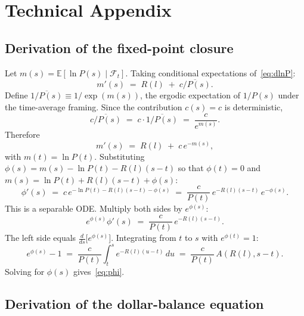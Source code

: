 \documentclass[11pt]{article}
\begin{document}
\newpage
\section{Technical Appendix}
\label{app:proofs}

\subsection{Derivation of the fixed-point closure}
\label{app:phi}

Let $m(s) = \mathbb{E}[\ln P(s) \mid \mathcal{F}_t]$. Taking
conditional expectations of~\eqref{eq:dlnP}:
\begin{equation}
  m'(s) \;=\; R(l) \;+\; \overline{c/P(s)}.
\end{equation}
Define $\overline{1/P(s)} \equiv 1/\exp(m(s))$, the ergodic
expectation of $1/P(s)$ under the time-average framing. Since the
contribution $c(s) = c$ is deterministic,
\begin{equation}
  \overline{c/P(s)} \;=\; c \cdot \overline{1/P(s)} \;=\; \frac{c}{e^{m(s)}}.
\end{equation}
Therefore
\begin{equation}
  m'(s) \;=\; R(l) \;+\; c\,e^{-m(s)},
\end{equation}
with $m(t) = \ln P(t)$. Substituting $\phi(s) = m(s) - \ln P(t) -
R(l)(s - t)$ so that $\phi(t) = 0$ and $m(s) = \ln P(t) + R(l)(s - t)
+ \phi(s)$:
\begin{equation}
  \phi'(s) \;=\; c\,e^{-\ln P(t) - R(l)(s - t) - \phi(s)}
  \;=\; \frac{c}{P(t)}\, e^{-R(l)(s - t)}\, e^{-\phi(s)}.
\end{equation}
This is a separable ODE. Multiply both sides by $e^{\phi(s)}$:
\begin{equation}
  e^{\phi(s)}\phi'(s) \;=\; \frac{c}{P(t)}\, e^{-R(l)(s - t)}.
\end{equation}
The left side equals $\frac{d}{ds}\bigl[e^{\phi(s)}\bigr]$. Integrating
from $t$ to $s$ with $e^{\phi(t)} = 1$:
\begin{equation}
  e^{\phi(s)} - 1 \;=\; \frac{c}{P(t)}\int_t^s e^{-R(l)(u - t)}\,du
  \;=\; \frac{c}{P(t)}\, A(R(l), s - t).
\end{equation}
Solving for $\phi(s)$ gives~\eqref{eq:phi}.

\subsection{Derivation of the dollar-balance equation}
\label{app:balance}
\end{document}
